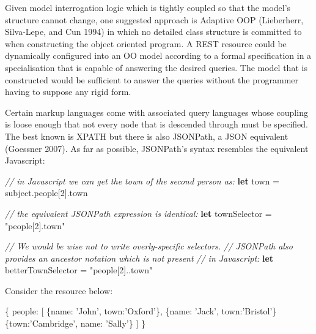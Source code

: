 \documentclass[12pt, ]{article}
\newenvironment{Shaded}{}{}
\newcommand{\KeywordTok}[1]{\textcolor[rgb]{0.00,0.44,0.13}{\textbf{{#1}}}}
\newcommand{\DataTypeTok}[1]{\textcolor[rgb]{0.56,0.13,0.00}{{#1}}}
\newcommand{\DecValTok}[1]{\textcolor[rgb]{0.25,0.63,0.44}{{#1}}}
\newcommand{\StringTok}[1]{\textcolor[rgb]{0.25,0.44,0.63}{{#1}}}
\newcommand{\CommentTok}[1]{\textcolor[rgb]{0.38,0.63,0.69}{\textit{{#1}}}}
\newcommand{\OtherTok}[1]{\textcolor[rgb]{0.00,0.44,0.13}{{#1}}}
\newcommand{\FunctionTok}[1]{\textcolor[rgb]{0.02,0.16,0.49}{{#1}}}
\newcommand{\NormalTok}[1]{{#1}}
\begin{document}
Given model interrogation logic which is tightly coupled so that the
model's structure cannot change, one suggested approach is Adaptive OOP
(Lieberherr, Silva-Lepe, and Cun 1994) in which no detailed class
structure is committed to when constructing the object oriented program.
A REST resource could be dynamically configured into an OO model
according to a formal specification in a specialisation that is capable
of answering the desired queries. The model that is constructed would be
sufficient to answer the queries without the programmer having to
suppose any rigid form.

Certain markup languages come with associated query languages whose
coupling is loose enough that not every node that is descended through
must be specified. The best known is XPATH but there is also JSONPath, a
JSON equivalent (Goessner 2007). As far as possible, JSONPath's syntax
resembles the equivalent Javascript:

\begin{Shaded}
\begin{Highlighting}[]
\CommentTok{// in Javascript we can get the town of the second person as:}
\KeywordTok{let} \NormalTok{town = }\OtherTok{subject}\NormalTok{.}\FunctionTok{people}\NormalTok{[}\DecValTok{2}\NormalTok{].}\FunctionTok{town}

\CommentTok{// the equivalent JSONPath expression is identical:}
\KeywordTok{let} \NormalTok{townSelector = }\StringTok{"people[2].town"}

\CommentTok{// We would be wise not to write overly-specific selectors.}
\CommentTok{// JSONPath also provides an ancestor notation which is not present}
\CommentTok{// in Javascript:}
\KeywordTok{let} \NormalTok{betterTownSelector = }\StringTok{"people[2]..town"}
\end{Highlighting}
\end{Shaded}

Consider the resource below:

\begin{Shaded}
\begin{Highlighting}[]
\NormalTok{\{}
   \DataTypeTok{people}\NormalTok{: [}
      \NormalTok{\{}\DataTypeTok{name}\NormalTok{: }\StringTok{'John'}\NormalTok{, }\DataTypeTok{town}\NormalTok{:}\StringTok{'Oxford'}\NormalTok{\},}
      \NormalTok{\{}\DataTypeTok{name}\NormalTok{: }\StringTok{'Jack'}\NormalTok{, }\DataTypeTok{town}\NormalTok{:}\StringTok{'Bristol'}\NormalTok{\}}
      \NormalTok{\{}\DataTypeTok{town}\NormalTok{:}\StringTok{'Cambridge'}\NormalTok{, }\DataTypeTok{name}\NormalTok{: }\StringTok{'Sally'}\NormalTok{\}}
   \NormalTok{]}
\NormalTok{\}}
\end{Highlighting}
\end{Shaded}
\end{document}
